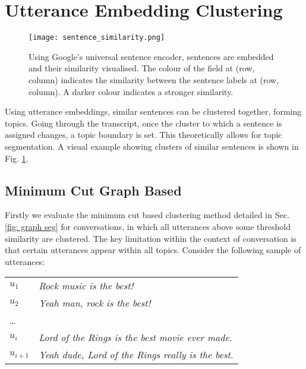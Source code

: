 \section[Clustering]{Utterance Embedding Clustering \label{method: utterance embedding clustering}}
    \begin{figure}[t]
        \centering
        \texttt{[image: sentence\_similarity.png]}
        \caption{Using Google's universal sentence encoder, sentences are embedded and their similarity visualised. The colour of the field at (row, column) indicates the similarity between the sentence labels at (row, column). A darker colour indicates a stronger similarity.}
        \label{fig:sentence similarity}
    \end{figure}
    Using \gls{utterance} \glspl{embedding}, similar sentences can be clustered together, forming topics. Going through the transcript, once the cluster to which a sentence is assigned changes, a topic boundary is set. This theoretically allows for topic segmentation. A visual example showing clusters of similar sentences is shown in Fig. \ref{fig:sentence similarity}.
    
    \subsection{Minimum Cut Graph Based \label{method: minimum cut}}
    
        Firstly we evaluate the minimum cut based clustering method detailed in Sec. \ref{fig: graph seg} for conversations, in which all \glspl{utterance} above some threshold similarity are clustered. The key limitation within the context of conversation is that certain \glspl{utterance} appear within all topics. Consider the following sample of \glspl{utterance}:
        \begin{table}[h]
            \begin{tabular}{l|l}
            $u_1$     & \textit{Rock music is the best!}                        \\
            $u_2$     & \textit{Yeah man, rock is the best!}                    \\
            \dots      &                                                         \\
            $u_i$     & \textit{Lord of the Rings is the best movie ever made.} \\
            $u_{i+1}$ & \textit{Yeah dude, Lord of the Rings really is the best.}              \\
            \end{tabular}
        \end{table}
        
